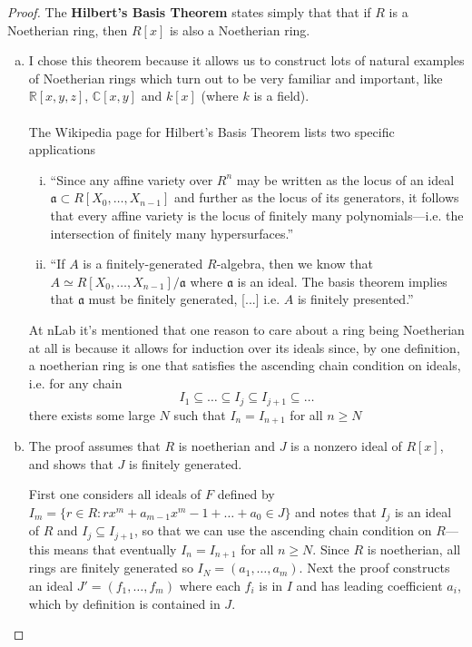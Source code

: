 \documentclass{article}
\newcommand{\set}[1]{\{ #1 \}}
\begin{document}
\begin{proof} The \textbf{Hilbert's Basis Theorem} states simply that that if
  $R$ is a Noetherian ring, then $R[x]$ is also a Noetherian ring.
  \begin{enumerate}[(a)]
    \item I chose this theorem because it allows us to construct
    lots of natural examples of Noetherian rings which turn out to be very
    familiar and important, like $\mathbb R[x,y,z]$, $\mathbb C[x,y]$ and
    $k[x]$ (where $k$ is a field).
    \\~\\
    The Wikipedia page for Hilbert's Basis Theorem lists two specific
    applications \begin{enumerate}[(i)]
      \item
        ``Since any affine variety over $\displaystyle R^n$
        may be written as the locus of an ideal $\mathfrak a \subset R[X_{0},\hdots ,X_{n-1}]$
        and further as the locus of its generators, it follows that every affine
        variety is the locus of finitely many polynomials---i.e. the intersection
        of finitely many hypersurfaces.''
      \item
        ``If $A$ is a finitely-generated $R$-algebra, then we know that
        $A\simeq R[X_{0},\dotsc ,X_{n-1}]/\mathfrak {a}$ where $\mathfrak {a}$
        is an ideal. The basis theorem implies that $\mathfrak {a}$ must be
        finitely generated, [...] i.e. $A$ is finitely presented.''
    \end{enumerate}
    At nLab it's mentioned that one reason to care about a ring being
    Noetherian at all is because it allows for induction over its ideals since,
    by one definition, a noetherian ring is one
    that satisfies the ascending chain condition on ideals, i.e. for any chain \[
      I_1 \subseteq \hdots \subseteq I_j \subseteq I_{j+1} \subseteq \hdots
    \] there exists some large $N$ such that $I_n = I_{n+1}$ for all $n \geq N$
    \item The proof assumes that $R$ is noetherian and $J$ is a nonzero
    ideal of $R[x]$, and shows that $J$ is finitely generated.

    First one considers all ideals of $F$ defined by
    $I_m = \set{r \in R : rx^m + a_{m-1}x^m-1 + \hdots + a_0 \in J}$ and notes
    that $I_j$ is an ideal of $R$ and $I_j \subseteq I_{j+1}$, so that we can
    use the ascending chain condition on $R$---this means that eventually
    $I_n = I_{n+1}$ for all $n \geq N$. Since $R$ is noetherian,
    all rings are finitely generated so $I_{N} = (a_1, \hdots, a_m)$.
    Next the proof constructs an ideal $J' = (f_1, \hdots, f_m)$ where each
    $f_i$ is in $I$ and has leading coefficient $a_i$, which by definition is
    contained in $J$.


\end{enumerate}
\end{proof}
\end{document}
